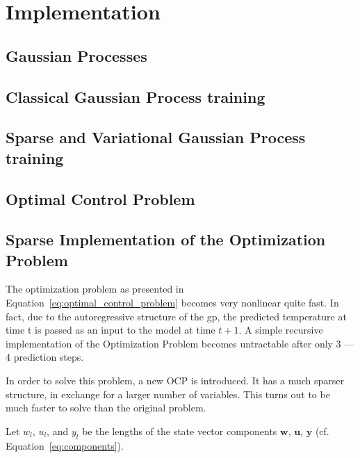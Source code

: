 \section{Implementation}


\subsection{Gaussian Processes}


\subsection{Classical Gaussian Process training}
\subsection{Sparse and Variational Gaussian Process training}


\subsection{Optimal Control Problem}

\subsection{Sparse Implementation of the Optimization Problem}

The optimization problem as presented in
Equation~\ref{eq:optimal_control_problem} becomes very nonlinear quite fast. In
fact, due to the autoregressive structure of the \acrshort{gp}, the predicted
temperature at time t is passed as an input to the model at time $t+1$. A simple
recursive implementation of the Optimization Problem becomes untractable after
only 3 --- 4 prediction steps. 

In order to solve this problem, a new OCP is introduced. It has a much sparser
structure, in exchange for a larger number of variables. This turns out to be
much faster to solve than the original problem.

Let $w_l$, $u_l$, and $y_l$ be the lengths of the state vector components
$\mathbf{w}$, $\mathbf{u}$, $\mathbf{y}$ (cf. Equation~\ref{eq:components}).

